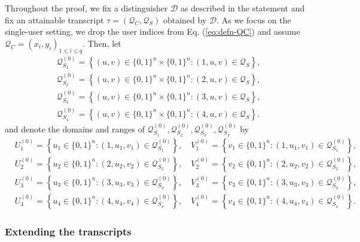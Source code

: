 \documentclass[journal=tosc,final,nohyperref]{iacrtrans}
\begin{document}
Throughout the proof, we fix a distinguisher $\mathcal{D}$ as described in the statement and fix an attainable transcript $\tau =\left(\mathcal{Q}_{C}, \mathcal{Q}_{S}\right)$ obtained by $\mathcal{D}$. As we focus on the single-user setting, we drop the user indices from Eq. (\ref{eq:defn-QC}) and assume $\mathcal{Q}_{C} = (x_{i},y_{i})_{1 \leq i \leq q}$. Then, let
%
$$
\begin{aligned}
&\mathcal{Q}_{S_{1}}^{(0)}=\left\{(u, v) \in\{0,1\}^{n} \times\{0,1\}^{n}:(1, u, v) \in \mathcal{Q}_{S} \right\},\\
&\mathcal{Q}_{S_{2}}^{(0)}=\left\{(u, v) \in\{0,1\}^{n} \times\{0,1\}^{n}:(2, u, v) \in \mathcal{Q}_{S} \right\},\\
&\mathcal{Q}_{S_{3}}^{(0)}=\left\{(u, v) \in\{0,1\}^{n} \times\{0,1\}^{n}:(3, u, v) \in \mathcal{Q}_{S} \right\},\\
&\mathcal{Q}_{S_{4}}^{(0)}=\left\{(u, v) \in\{0,1\}^{n} \times\{0,1\}^{n}:(4, u, v) \in \mathcal{Q}_{S} \right\}.
\end{aligned}
$$
%
and denote the domains and ranges of $\mathcal{Q}_{S_{1}}^{(0)}, \mathcal{Q}_{S_{2}}^{(0)}, \mathcal{Q}_{S_{3}}^{(0)}, \mathcal{Q}_{S_{4}}^{(0)}$ by        {\small
	\begin{align*}
	&U_{1}^{(0)}=\left\{u_{1} \in\{0,1\}^{n}:\left(1, u_{1}, v_{1}\right) \in \mathcal{Q}_{S_{1}}^{(0)}\right\}, \quad V_{1}^{(0)}=\left\{v_{1} \in\{0,1\}^{n}:\left(1, u_{1}, v_{1}\right) \in \mathcal{Q}_{S_{1}}^{(0)}\right\},\\
	&U_{2}^{(0)}=\left\{u_{2} \in\{0,1\}^{n}:\left(2, u_{2}, v_{2}\right) \in \mathcal{Q}_{S_{2}}^{(0)}\right\}, \quad V_{2}^{(0)}=\left\{v_{2} \in\{0,1\}^{n}:\left(2, u_{2}, v_{2}\right) \in \mathcal{Q}_{S_{2}}^{(0)}\right\},\\
	&U_{3}^{(0)}=\left\{u_{3} \in\{0,1\}^{n}:\left(3, u_{3}, v_{3}\right) \in \mathcal{Q}_{S_{3}}^{(0)}\right\}, \quad V_{3}^{(0)}=\left\{v_{3} \in\{0,1\}^{n}:\left(3, u_{3}, v_{3}\right) \in \mathcal{Q}_{S_{3}}^{(0)}\right\},\\
	&U_{4}^{(0)}=\left\{u_{4} \in\{0,1\}^{n}:\left(4, u_{4}, v_{4}\right) \in \mathcal{Q}_{S_{4}}^{(0)}\right\}, \quad V_{4}^{(0)}=\left\{v_{4} \in\{0,1\}^{n}:\left(4, u_{4}, v_{4}\right) \in \mathcal{Q}_{S_{4}}^{(0)}\right\}.
	\end{align*}
}%
%



\subsubsection{Extending the transcripts}
\end{document}
